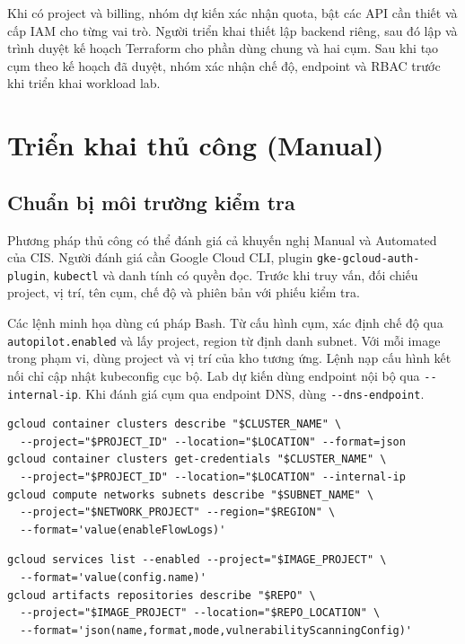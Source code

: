 Khi có project và billing, nhóm dự kiến xác nhận quota, bật các API cần thiết và cấp IAM cho từng vai trò. Người triển khai thiết lập backend riêng, sau đó lập và trình duyệt kế hoạch Terraform cho phần dùng chung và hai cụm. Sau khi tạo cụm theo kế hoạch đã duyệt, nhóm xác nhận chế độ, endpoint và RBAC trước khi triển khai workload lab.

\section{Triển khai thủ công (Manual)}
\label{sec:ch3-manual}

\subsection{Chuẩn bị môi trường kiểm tra}
\label{subsec:ch3-manual-prep}

Phương pháp thủ công có thể đánh giá cả khuyến nghị Manual và Automated của CIS. Người đánh giá cần Google Cloud CLI, plugin \texttt{gke-gcloud-auth-plugin}, \texttt{kubectl} và danh tính có quyền đọc. Trước khi truy vấn, đối chiếu project, vị trí, tên cụm, chế độ và phiên bản với phiếu kiểm tra.

Các lệnh minh họa dùng cú pháp Bash. Từ cấu hình cụm, xác định chế độ qua \texttt{autopilot.enabled} và lấy project, region từ định danh subnet. Với mỗi image trong phạm vi, dùng project và vị trí của kho tương ứng. Lệnh nạp cấu hình kết nối chỉ cập nhật kubeconfig cục bộ. Lab dự kiến dùng endpoint nội bộ qua \texttt{-{}-internal-ip}. Khi đánh giá cụm qua endpoint DNS, dùng \texttt{-{}-dns-endpoint}.

{\chapterthreecodesettings
\begin{verbatim}
gcloud container clusters describe "$CLUSTER_NAME" \
  --project="$PROJECT_ID" --location="$LOCATION" --format=json
gcloud container clusters get-credentials "$CLUSTER_NAME" \
  --project="$PROJECT_ID" --location="$LOCATION" --internal-ip
gcloud compute networks subnets describe "$SUBNET_NAME" \
  --project="$NETWORK_PROJECT" --region="$REGION" \
  --format='value(enableFlowLogs)'
\end{verbatim}
}

\noindent\begin{minipage}{\linewidth}
{\chapterthreecodesettings
\begin{verbatim}
gcloud services list --enabled --project="$IMAGE_PROJECT" \
  --format='value(config.name)'
gcloud artifacts repositories describe "$REPO" \
  --project="$IMAGE_PROJECT" --location="$REPO_LOCATION" \
  --format='json(name,format,mode,vulnerabilityScanningConfig)'
\end{verbatim}
}
\end{minipage}

